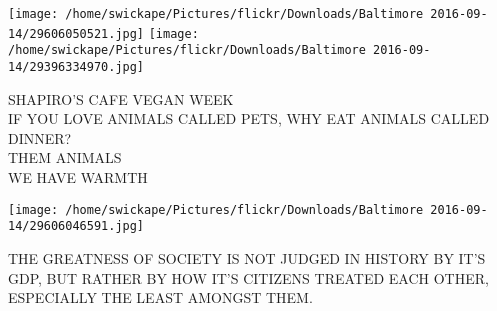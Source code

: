 \documentclass[10pt,letterpaper]{article}
\begin{document}
\texttt{[image: /home/swickape/Pictures/flickr/Downloads/Baltimore 2016-09-14/29606050521.jpg]}
\texttt{[image: /home/swickape/Pictures/flickr/Downloads/Baltimore 2016-09-14/29396334970.jpg]}

SHAPIRO'S CAFE VEGAN WEEK\\
IF YOU LOVE ANIMALS CALLED PETS, WHY EAT ANIMALS CALLED DINNER?\\
THEM ANIMALS\\
WE HAVE WARMTH
\pagebreak

\texttt{[image: /home/swickape/Pictures/flickr/Downloads/Baltimore 2016-09-14/29606046591.jpg]}

THE GREATNESS OF SOCIETY IS NOT JUDGED IN HISTORY BY IT'S GDP, BUT RATHER BY HOW IT'S CITIZENS TREATED EACH OTHER, ESPECIALLY THE LEAST AMONGST THEM.
\pagebreak
\end{document}
